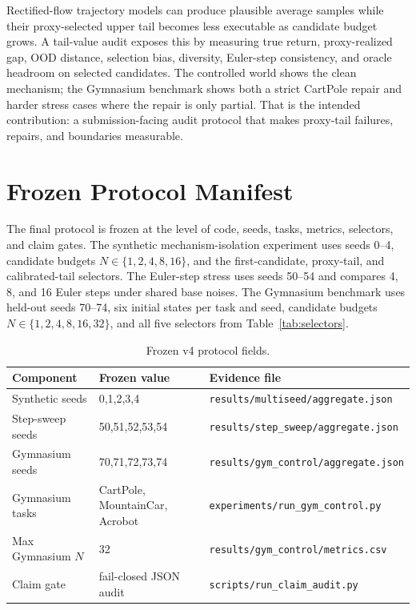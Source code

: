 \documentclass[10pt]{article}
\begin{document}
Rectified-flow trajectory models can produce plausible average samples while their proxy-selected upper tail becomes less executable as candidate budget grows. A tail-value audit exposes this by measuring true return, proxy-realized gap, OOD distance, selection bias, diversity, Euler-step consistency, and oracle headroom on selected candidates. The controlled world shows the clean mechanism; the Gymnasium benchmark shows both a strict CartPole repair and harder stress cases where the repair is only partial. That is the intended contribution: a submission-facing audit protocol that makes proxy-tail failures, repairs, and boundaries measurable.

\appendix

\section{Frozen Protocol Manifest}

The final protocol is frozen at the level of code, seeds, tasks, metrics, selectors, and claim gates. The synthetic mechanism-isolation experiment uses seeds 0--4, candidate budgets \(N \in \{1,2,4,8,16\}\), and the first-candidate, proxy-tail, and calibrated-tail selectors. The Euler-step stress uses seeds 50--54 and compares 4, 8, and 16 Euler steps under shared base noises. The Gymnasium benchmark uses held-out seeds 70--74, six initial states per task and seed, candidate budgets \(N \in \{1,2,4,8,16,32\}\), and all five selectors from Table~\ref{tab:selectors}.

\begin{table}[h]
\centering
\caption{Frozen v4 protocol fields.}
\label{tab:protocol}
\begin{tabular}{lll}
\toprule
Component & Frozen value & Evidence file \\
\midrule
Synthetic seeds & 0,1,2,3,4 & \texttt{results/multiseed/aggregate.json} \\
Step-sweep seeds & 50,51,52,53,54 & \texttt{results/step\_sweep/aggregate.json} \\
Gymnasium seeds & 70,71,72,73,74 & \texttt{results/gym\_control/aggregate.json} \\
Gymnasium tasks & CartPole, MountainCar, Acrobot & \texttt{experiments/run\_gym\_control.py} \\
Max Gymnasium \(N\) & 32 & \texttt{results/gym\_control/metrics.csv} \\
Claim gate & fail-closed JSON audit & \texttt{scripts/run\_claim\_audit.py} \\
\bottomrule
\end{tabular}
\end{table}
\end{document}
